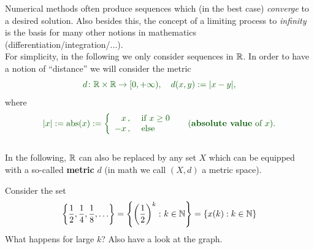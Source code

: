 \begin{frame} 
Numerical methods often produce sequences which (in the best case) \textit{converge} to a desired solution. Also besides this, the concept of a limiting process to \textit{infinity} is the basis for many other notions in mathematics (differentiation/integration/...).\\
\vspace{0.5cm}
For simplicity, in the following we only consider sequences in ${\mathbb{R}}$. 
In order to have a notion of ``distance'' we will consider the metric
$$\color{defgruen}d\colon\R \times \R \to [0,+\infty), ~~~d(x,y) := |x-y|,$$ where 
$$ \color{defgruen}
|x|:=\text{abs}(x):=\left\{
\begin{array}{rl}
x\, ,&\text{ if } x\geq 0\\
-x\, ,&\text{ else}
\end{array}
\right.~~~~\text{(\textbf{\color{defgruen} absolute value} of $x$)}.$$
~\\
In the following, ${\mathbb{R}}$ can also be replaced by any set $X$ which can be equipped with a so-called \textbf{\color{defgruen}metric} $d$ (in math we call $(X,d)$ a metric space).
\begin{ex} \blank 
Consider the set 
\begin{align*}
\left\lbrace \frac{1}{2}, \frac{1}{4}, \frac{1}{8},\ldots\right\rbrace   = \left\lbrace\left(\frac{1}{2}\right) ^k\colon k \in {\mathbb{N}} \right\rbrace = \{x(k): k \in{\mathbb{N}}\}
\end{align*}
What happens for large $k$? Also have a look at the graph.
\end{ex}
\end{frame}

